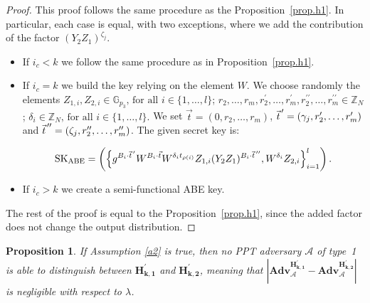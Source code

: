 \documentclass[a4paper,10pt]{article}
\newtheorem{proposition}{Proposition}
\newcommand{\G}{\mathbb{G}}
\newcommand{\Z}{\mathbb{Z}}
\newcommand{\adv}{\textbf{Adv}}
\newcommand{\varRow}{l}
\newcommand{\varColumn}{m}
\newcommand{\pvec}[2][]{{\hspace{-0.05em}\vec{\hspace{0.05em}#2}\mkern2mu\vphantom{#2}}^\prime_{\hspace{-0.18em}#1}}
\newcommand{\ppvec}[2][]{{\hspace{-0.05em}\vec{\hspace{0.05em}#2}\mkern2mu\vphantom{#2}}^{\prime\prime}_{\hspace{-0.18em}#1}}
\newcommand{\randomchoose}[1]{We choose randomly the element\ifstrequal{#1}{s}{}{s} }
\newcommand{\game}[2]{$\mathbf{#1_{#2}}$}
\newcommand{\mathgame}[2]{\mathbf{#1_{#2}}}
\newcommand{\typeone}{type~1}
\begin{document}
	\begin{proof}
		This proof follows the same procedure as the Proposition~\ref{prop.h1}.
		In particular, each case is equal, with two exceptions, where we add the contribution of the factor $(Y_2Z_1)^{\zeta_j}$.
		\begin{itemize}
			\item
			If $i_c<k$ we follow the same procedure as in Proposition~\ref{prop.h1}.
			\item
			If $i_c=k$ we build the key relying on the element $W$.
			\randomchoose{p}{$Z_{1,i},Z_{2,i}\in\G_{p_3}\text{, for all }i\in \{1,\ldots,\varRow\}$;
				$r_{2},\ldots,r_{\varColumn},r^\prime_{2},\ldots,r^\prime_{\varColumn},r^{\prime\prime}_{2},\ldots,\allowbreak{}r^{\prime\prime}_{\varColumn}\in \Z_N$;
				$\delta_i\in\Z_N\text{, for all }i\in \{1,\ldots,\varRow\}$.
			}
			We set $\vec{t}=(0,r_{2},\ldots,r_{\varColumn})$, $\pvec{t}=(\gamma_j,r^\prime_{2},\ldots,r^\prime_{\varColumn})$ and $\ppvec{t}=(\zeta_j,r^{\prime\prime}_{2},\ldots,r^{\prime\prime}_{\varColumn})$.
			The given secret key is:
			
			\[
				\mathrm{SK}_\textnormal{ABE}=\left( \left\{ g^{B_i\cdot \pvec{t}} W^{B_i\cdot\vec{t}}W^{\delta_i t_{\rho(i)}} Z_{1,i}(Y_2Z_1)^{B_i\cdot\ppvec{t}}, W^{\delta_i}Z_{2,i} \right\}_{i=1}^{\varRow} \right).
			\]
			\item
			If $i_c>k$ we create a semi-functional ABE key.
		\end{itemize}
		The rest of the proof is equal to the Proposition~\ref{prop.h1}, since the added factor does not change the output distribution.
	\end{proof}
	\begin{proposition}
		\label{prop.h4}
		If Assumption \ref{a2} is true, then no PPT adversary $\mathcal{A}$ of \typeone{} is able to distinguish between \game{H^\prime}{k,1} and \game{H^\prime}{k,2}, meaning that $\left| \adv_{\mathcal{A}}^{\mathgame{H^\prime}{k,1}} - \adv_{\mathcal{A}}^{\mathgame{H^\prime}{k,2}}\right|$ is negligible with respect to $\lambda$.
	\end{proposition}
\end{document}

